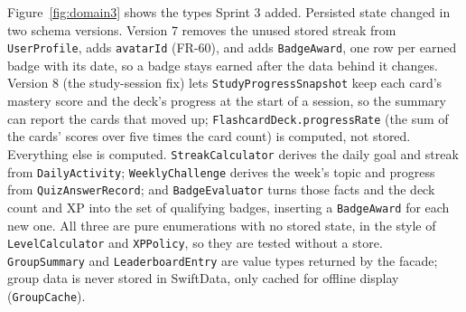 \documentclass[12pt,letterpaper]{article}
\begin{document}
Figure~\ref{fig:domain3} shows the types Sprint 3 added. Persisted state changed
in two schema versions. Version 7 removes the unused stored streak from
\texttt{UserProfile}, adds \texttt{avatarId} (FR-60), and adds \texttt{BadgeAward}, one
row per earned badge with its date, so a badge stays earned after the data behind it
changes. Version 8 (the study-session fix) lets \texttt{StudyProgressSnapshot} keep
each card's mastery score and the deck's progress at the start of a session, so the
summary can report the cards that moved up; \texttt{FlashcardDeck.progressRate} (the
sum of the cards' scores over five times the card count) is computed, not stored. Everything else is computed. \texttt{StreakCalculator} derives the daily goal
and streak from \texttt{DailyActivity}; \texttt{WeeklyChallenge} derives the week's
topic and progress from \texttt{QuizAnswerRecord}; and \texttt{BadgeEvaluator} turns
those facts and the deck count and XP into the set of qualifying badges, inserting a
\texttt{BadgeAward} for each new one. All three are pure enumerations with no stored
state, in the style of \texttt{LevelCalculator} and \texttt{XPPolicy}, so they are
tested without a store. \texttt{GroupSummary} and \texttt{LeaderboardEntry} are value
types returned by the facade; group data is never stored in SwiftData, only cached for
offline display (\texttt{GroupCache}).

\FloatBarrier
\end{document}
